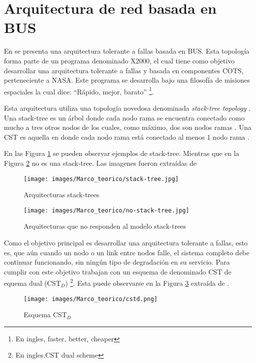  \section{Arquitectura de red basada en BUS}
En \cite{Tai99} se presenta una arquitectura tolerante a fallas basada en BUS. Esta topología forma parte de un programa denominado X2000, el cual tiene como objetivo desarrollar una arquitectura tolerante a fallas y basada en componentes COTS, perteneciente a \ac{NASA}. Este programa se desarrolla bajo una filosofía de misiones espaciales la cual dice: ``Rápido, mejor, barato'' \footnote{En ingles, faster, better, cheaper}.

Esta arquitectura utiliza una topología novedosa denominada \textit{stack-tree topology} \citep{Chau99} \citep{Tai99}. Una stack-tree es un árbol donde cada nodo rama se encuentra conectado como mucho a tres otros nodos de los cuales, como máximo, dos son nodos ramas \citep{Tai99}. Una \ac{CST} es aquella en donde cada nodo rama está conectado al menos 1 nodo rama \citep{Tai99}.

En las Figura \ref{fig:stack-tree} se pueden observar ejemplos de stack-tree. Mientras que en la Figura \ref{fig:no-stack-tree} no es una stack-tree. Las imagenes fueron extraídas de \cite{Tai99}

\begin{figure}[h]
 \centering
 \texttt{[image: images/Marco\_teorico/stack-tree.jpg]}
  \caption{Arquitecturas stack-trees}
\label{fig:stack-tree}
\end{figure}

\begin{figure}[h]
 \centering
 \texttt{[image: images/Marco\_teorico/no-stack-tree.jpg]}
  \caption{Arquitecturas que no responden al modelo stack-trees}
\label{fig:no-stack-tree}
\end{figure}

Como el objetivo principal es desarrollar una arquitectura tolerante a fallas, esto es, que aún cuando un nodo o un link entre nodos falle, el sistema completo debe continuar funcionando, sin ningún tipo de degradación en su servicio. Para cumplir con este objetivo \cite{Tai99} trabajan con un esquema de denominado \ac{CST} de equema dual (\ac{CST}$_D$) \footnote{En ingles,\ac{CST} dual scheme}. Esta puede observarse en la Figura \ref{fig:cstd} extraída de \cite{Tai99}.

\begin{figure}[h]
 \centering
 \texttt{[image: images/Marco\_teorico/cstd.png]}
  \caption{Esquema CST$_D$}
\label{fig:cstd}
\end{figure}


